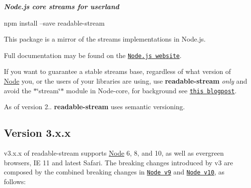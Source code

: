 {\itshape {\bfseries Node.\+js core streams for userland}} \href{https://travis-ci.com/nodejs/readable-stream}{\tt }

\href{https://nodei.co/npm/readable-stream/}{\tt } \href{https://nodei.co/npm/readable-stream/}{\tt }

\href{https://saucelabs.com/u/readabe-stream}{\tt }


\begin{DoxyCode}
npm install --save readable-stream
\end{DoxyCode}


This package is a mirror of the streams implementations in Node.\+js.

Full documentation may be found on the \href{https://nodejs.org/dist/v10.15.3/docs/api/stream.html}{\tt Node.\+js website}.

If you want to guarantee a stable streams base, regardless of what version of \mbox{\hyperlink{classNode}{Node}} you, or the users of your libraries are using, use {\bfseries readable-\/stream} {\itshape only} and avoid the $\ast$\char`\"{}stream\char`\"{}$\ast$ module in Node-\/core, for background see \href{http://r.va.gg/2014/06/why-i-dont-use-nodes-core-stream-module.html}{\tt this blogpost}.

As of version 2.. {\bfseries readable-\/stream} uses semantic versioning.

\subsection*{Version 3.\+x.\+x}

v3.\+x.\+x of {\ttfamily readable-\/stream} supports \mbox{\hyperlink{classNode}{Node}} 6, 8, and 10, as well as evergreen browsers, IE 11 and latest Safari. The breaking changes introduced by v3 are composed by the combined breaking changes in \href{https://nodejs.org/en/blog/release/v9.0.0/}{\tt Node v9} and \href{https://nodejs.org/en/blog/release/v10.0.0/}{\tt Node v10}, as follows\+:


